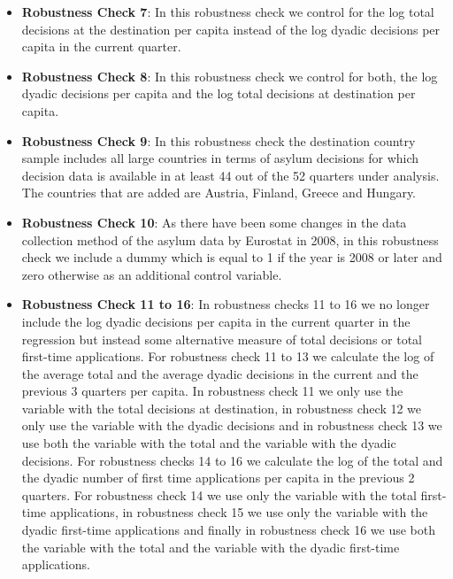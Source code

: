\documentclass[11pt,a4paper]{scrartcl}
\begin{document}
\begin{itemize}
	\item \textbf{Robustness Check 7}: In this robustness check we control for the log total decisions at the destination per capita instead of the log dyadic decisions per capita in the current quarter.
	
	\item \textbf{Robustness Check 8}: In this robustness check we control for both, the log dyadic decisions per capita and the log total decisions at destination per capita. 
	
	\item \textbf{Robustness Check 9}: In this robustness check the destination country sample includes all large countries in terms of asylum decisions for which decision data is available in at least 44 out of the 52 quarters under analysis. The countries that are added are Austria, Finland, Greece and Hungary.  
	
	\item \textbf{Robustness Check 10}: As there have been some changes in the data collection method of the asylum data by Eurostat in 2008, in this robustness check we include a dummy which is equal to 1 if the year is 2008 or later and zero otherwise as an additional control variable. 
	
	\item \textbf{Robustness Check 11 to 16}:  In robustness checks 11 to 16 we no longer include the log dyadic decisions per capita in the current quarter in the regression but instead some alternative measure of total decisions or total first-time applications. For robustness check 11 to 13 we calculate the log of the average total and the average dyadic decisions in the current and the previous 3 quarters per capita. In robustness check 11 we only use the variable with the total decisions at destination, in robustness check 12 we only use the variable with the dyadic decisions and in robustness check 13 we use both the variable with the total and the variable with the dyadic decisions. For robustness checks 14 to 16 we calculate the log of the total and the dyadic number of first time applications per capita in the previous 2 quarters. For robustness check 14 we use only the variable with the total first-time applications, in robustness check 15 we use only the variable with the dyadic first-time applications and finally in robustness check 16 we use both the variable with the total and the variable with the dyadic first-time applications.  
 

\end{itemize}
\end{document}
